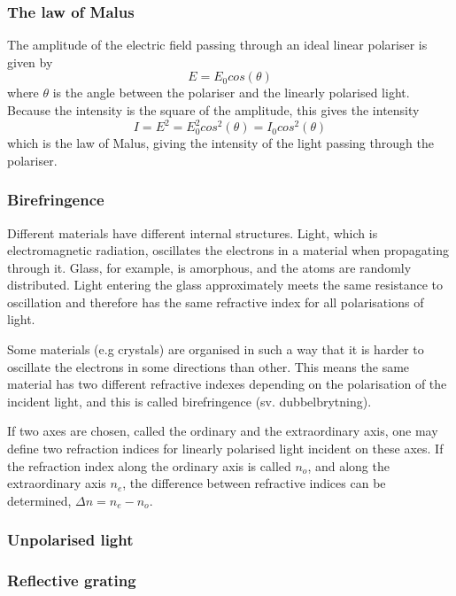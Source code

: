 \documentclass[a4paper]{article}
\begin{document}
\subsubsection{The law of Malus}
The amplitude of the electric field passing through an ideal linear polariser is given by
\begin{equation*}
    E = E_0 cos(\theta)
\end{equation*}
where $\theta$ is the angle between the polariser and the linearly polarised light. Because the intensity is the square of the amplitude, this gives the intensity
\begin{equation*}
    I = E^2 = E_0^2 cos^2(\theta) = I_0 cos^2(\theta)
\end{equation*}
which is the law of Malus, giving the intensity of the light passing through the polariser.

\subsubsection{Birefringence}
Different materials have different internal structures. Light, which is electromagnetic radiation, oscillates the electrons in a material when propagating through it.
Glass, for example, is amorphous, and the atoms are randomly distributed. Light entering the glass approximately meets the same resistance to oscillation and therefore
has the same refractive index for all polarisations of light. 

Some materials (e.g crystals) are organised in such a way that it is harder to oscillate the electrons in
some directions than other. This means the same material has two different refractive indexes depending on the polarisation of the incident light, and this is called birefringence
(sv. dubbelbrytning). 

If two axes are chosen, called the ordinary and the extraordinary axis, one may define two refraction indices for linearly polarised light incident on these
axes. If the refraction index along the ordinary axis is called $n_o$, and along the extraordinary axis $n_e$, the difference between refractive indices can be determined,
$\Delta n = n_e - n_o$.

\subsubsection{Unpolarised light}

\subsubsection{Reflective grating}
\pagebreak
\end{document}
